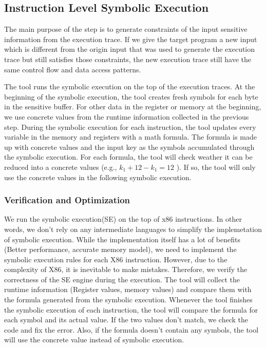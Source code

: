 \subsection{Instruction Level Symbolic Execution}
\label{InstructionSE}
The main purpose of the step is to generate 
constraints of the input sensitive information from the execution trace. 
If we give the target program a new input which 
is different from the origin input that was used 
to generate the execution trace but still satisfies those constraints,
the new execution trace still have the same control flow and 
data access patterns. 

The tool runs the symbolic execution on the top of the execution traces.
At the beginning of the symbolic execution, the tool creates fresh 
symbols for each byte in the sensitive buffer. For other data in the 
register or memory at the beginning, we use concrete values from the 
runtime information collected in
the previous step. During the symbolic execution for each instruction, 
the tool updates every variable in the memory and registers with a
math formula. The formula is made up with concrete values and 
the input key as the symbols accumulated through the symbolic execution.
For each formula, the tool will check weather it can be reduced
into a concrete values (e.g., $k_1+12-k_1 = 12$ ). 
If so, the tool will only use the concrete values in the 
following symbolic execution.

\subsubsection{Verification and Optimization}
We run the symbolic execution(SE) on the top of x86 instructions.
In other words, we don’t rely on any intermediate languages to 
simplify the implemetation of symbolic execution. 
While the implementation itself 
has a lot of benefits (Better performance, accurate memory model), 
we need to implement the symbolic execution 
rules for each X86 instruction. 
However, due to the complexity of X86, it is inevitable to make mistakes. 
Therefore, we verify the correctness of the SE engine during the execution. 
The tool will collect the runtime information (Register values, 
memory values) and compare them with the formula generated from the 
symbolic execution. Whenever the tool finishes the symbolic execution 
of each instruction, the tool will compare the formula for each symbol 
and its actual value. If the two values don't match, we check the code
and fix the error. Also, if the formula doesn't contain any symbols,
the tool will use the concrete value instead of symbolic execution.

